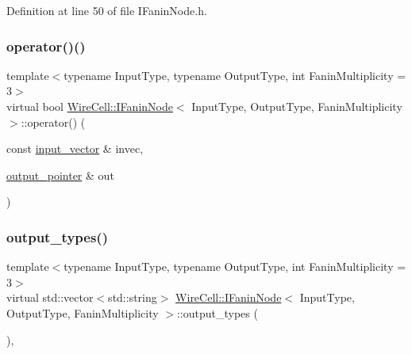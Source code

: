 Definition at line 50 of file I\+Fanin\+Node.\+h.

\mbox{\label{class_wire_cell_1_1_i_fanin_node_a48e76217dae73d64cb0b40cf8291564a}} 
\subsubsection{\texorpdfstring{operator()()}{operator()()}\hspace{0.1cm}{\footnotesize\ttfamily [2/2]}}
{\footnotesize\ttfamily template$<$typename Input\+Type, typename Output\+Type, int Fanin\+Multiplicity = 3$>$ \\
virtual bool \hyperlink{class_wire_cell_1_1_i_fanin_node}{Wire\+Cell\+::\+I\+Fanin\+Node}$<$ Input\+Type, Output\+Type, Fanin\+Multiplicity $>$\+::operator() (\begin{DoxyParamCaption}\item[{const \hyperlink{class_wire_cell_1_1_i_fanin_node_aec26233b8b7756c5a42280a5db47ffda}{input\+\_\+vector} \&}]{invec,  }\item[{\hyperlink{class_wire_cell_1_1_i_fanin_node_a748d9cd1916dda1cb12c3376b229f906}{output\+\_\+pointer} \&}]{out }\end{DoxyParamCaption})\hspace{0.3cm}{\ttfamily [pure virtual]}}

\mbox{\label{class_wire_cell_1_1_i_fanin_node_a4d30445b258b6534fdc7825b63687642}} 
\subsubsection{\texorpdfstring{output\+\_\+types()}{output\_types()}}
{\footnotesize\ttfamily template$<$typename Input\+Type, typename Output\+Type, int Fanin\+Multiplicity = 3$>$ \\
virtual std\+::vector$<$std\+::string$>$ \hyperlink{class_wire_cell_1_1_i_fanin_node}{Wire\+Cell\+::\+I\+Fanin\+Node}$<$ Input\+Type, Output\+Type, Fanin\+Multiplicity $>$\+::output\+\_\+types (\begin{DoxyParamCaption}{ }\end{DoxyParamCaption})\hspace{0.3cm}{\ttfamily [inline]}, {\ttfamily [virtual]}}



